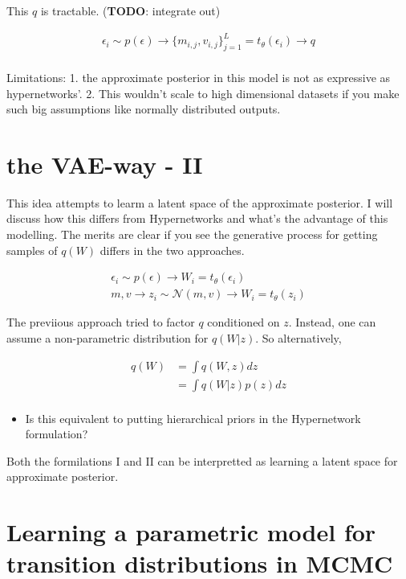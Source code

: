 \documentclass[twoside]{article}
\begin{document}
This $q$ is tractable. (\textbf{TODO}: integrate out)

\begin{align}
\epsilon_i \sim p(\epsilon) \rightarrow \{m_{i,j},v_{i,j}\}_{j=1}^{L} = t_\theta(\epsilon_i) \rightarrow q\\
\end{align}

Limitations: 1. the approximate posterior in this model is not as expressive as hypernetworks'. 2. This wouldn't scale to high dimensional datasets if you make such big assumptions like normally distributed outputs. 

\section{the VAE-way - II}

This idea attempts to learm a latent space of the approximate posterior. I will discuss how this differs from Hypernetworks and what's the advantage of this modelling. The merits are clear if you see the generative process for getting samples of $q(W)$ differs in the two approaches. 

\begin{align}
\epsilon_i \sim p(\epsilon) \rightarrow W_i = t_\theta(\epsilon_i)\\
m,v \rightarrow z_i \sim \mathcal{N}(m,v) \rightarrow W_i = t_\theta(z_i)
\end{align}

The previious approach tried to factor $q$ conditioned on $z$. Instead, one can assume a non-parametric distribution for $q(W|z)$. So alternatively,


\begin{align}
q(W) &= \int q(W,z)dz\\
&= \int q(W|z)p(z)dz\\
\end{align}

\begin{itemize}
  \item Is this equivalent to putting hierarchical priors in the Hypernetwork formulation? 
\end{itemize}

Both the formilations I and II can be interpretted as learning a latent space for approximate posterior. 

 
\section{Learning a parametric model for transition distributions in MCMC}
\end{document}
